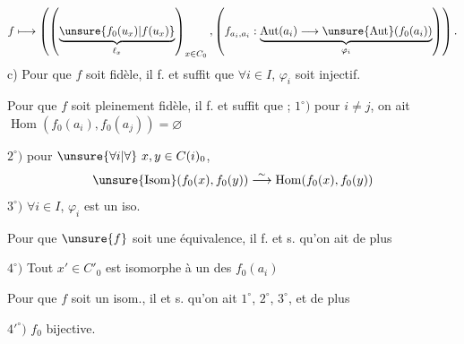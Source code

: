 \[
f\longmapsto\left(
\left(\underbrace{\unsure{f_0(u_x)|f(u_x)}}_{\ell_x}\right)_{x\in C_0},
\left(f_{a_i,a_i}:\underbrace{\operatorname{Aut}(a_i)\longrightarrow
\unsure{\operatorname{Aut}}(f_0(a_i))}_{\varphi_i}\right)\right).
\]
c) Pour que $f$ soit fidèle, il f. et suffit que $\forall i\in I$, $\varphi_i$ soit injectif.

Pour que $f$ soit pleinement fidèle, il f. et suffit que ;
$1^\circ)$ pour $i\ne j$, on ait
$\operatorname{Hom}(f_0(a_i),f_0(a_j))=\varnothing$

$2^\circ)$ pour $\unsure{\forall i|\forall}\ x,y\in C(i)_0$,
\[
\unsure{\operatorname{Isom}}(f_0(x),f_0(y))\overset{\sim}{\longrightarrow}
\operatorname{Hom}(f_0(x),f_0(y))
\]
$3^\circ)$ $\forall i\in I$, $\varphi_i$ est un iso.


Pour que $\unsure{f}$ soit une équivalence,
il f. et s. qu'on ait de plus

$4^\circ)$ Tout $x'\in C'_0$ est isomorphe à un des $f_0(a_i)$

Pour que $f$ soit un isom.,
il  et s. qu'on ait $1^\circ$, $2^\circ$, $3^\circ$,
et de plus

$4'^\circ)$ $f_0$ bijective.
